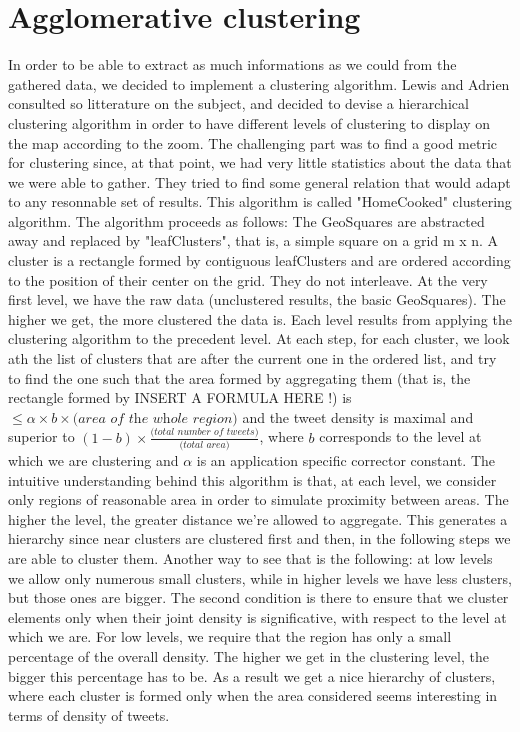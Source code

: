 \section{ Agglomerative clustering}
\label{sec:agg_clustering}
In order to be able to extract as much informations as we could from the gathered data, we decided to implement a clustering algorithm. Lewis and Adrien consulted so litterature on the subject, and decided to devise a hierarchical clustering algorithm in order to have different levels of clustering to display on the map according to the zoom. 
The challenging part was to find a good metric for clustering since, at that point, we had very little statistics about the data that we were able to gather. They tried to find some general relation that would adapt to any resonnable set of results. This algorithm is called "HomeCooked" clustering algorithm.
The algorithm proceeds as follows: 
The GeoSquares are abstracted away and replaced by "leafClusters", that is, a simple square on a grid m x n. A cluster is a rectangle formed by contiguous leafClusters and are ordered according to the position of their center on the grid. They do not interleave. 
At the very first level, we have the raw data (unclustered results, the basic GeoSquares). The higher we get, the more clustered the data is. 
Each level results from applying the clustering algorithm to the precedent level. 
At each step, for each cluster, we look ath the list of clusters that are after the current one in the ordered list, and try to find the one such that the area formed by aggregating them (that is, the rectangle formed by INSERT A FORMULA HERE !) is $\leq \alpha \times b \times \textit{(area of the whole region)}$ and the tweet density is maximal and superior to $(1-b)\times \frac{\textit{(total number of tweets)}}{\textit{(total area)}}$, where $b$ corresponds to the level at which we are clustering and $\alpha$ is an application specific corrector constant. 
The intuitive understanding behind this algorithm is that, at each level, we consider only regions of reasonable area in order to simulate proximity between areas. The higher the level, the greater distance we're allowed to aggregate. This generates a hierarchy since near clusters are clustered first and then, in the following steps we are able to cluster them. Another way to see that is the following: at low levels we allow only numerous small clusters, while in higher levels we have less clusters, but those ones are bigger. The second condition is there to ensure that we cluster elements only when their joint density is significative, with respect to the level at which we are. For low levels, we require that the region has only a small percentage of the overall density. The higher we get in the clustering level, the bigger this percentage has to be. As a result we get a nice hierarchy of clusters, where each cluster is formed only when the area considered seems interesting in terms of density of tweets. 
